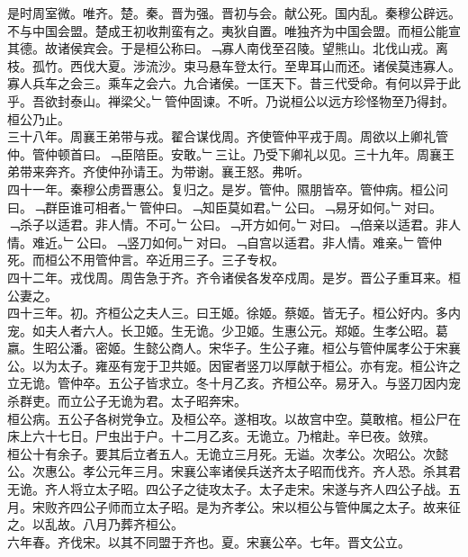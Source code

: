 \documentclass{zhvt-classic}
\begin{document}
\hspace*{2em}是时周室微。唯齐。楚。秦。晋为强。晋初与会。献公死。国内乱。秦穆公辟远。不与中国会盟。楚成王初收荆蛮有之。夷狄自置。唯独齐为中国会盟。而桓公能宣其德。故诸侯宾会。于是桓公称曰。﹁寡人南伐至召陵。望熊山。北伐山戎。离枝。孤竹。西伐大夏。涉流沙。束马悬车登太行。至卑耳山而还。诸侯莫违寡人。寡人兵车之会三。乘车之会六。九合诸侯。一匡天下。昔三代受命。有何以异于此乎。吾欲封泰山。禅梁父。﹂管仲固谏。不听。乃说桓公以远方珍怪物至乃得封。桓公乃止。\\
\hspace*{2em}三十八年。周襄王弟带与戎。翟合谋伐周。齐使管仲平戎于周。周欲以上卿礼管仲。管仲顿首曰。﹁臣陪臣。安敢。﹂三让。乃受下卿礼以见。三十九年。周襄王弟带来奔齐。齐使仲孙请王。为带谢。襄王怒。弗听。\\
\hspace*{2em}四十一年。秦穆公虏晋惠公。复归之。是岁。管仲。隰朋皆卒。管仲病。桓公问曰。﹁群臣谁可相者。﹂管仲曰。﹁知臣莫如君。﹂公曰。﹁易牙如何。﹂对曰。﹁杀子以适君。非人情。不可。﹂公曰。﹁开方如何。﹂对曰。﹁倍亲以适君。非人情。难近。﹂公曰。﹁竖刀如何。﹂对曰。﹁自宫以适君。非人情。难亲。﹂管仲死。而桓公不用管仲言。卒近用三子。三子专权。\\
\hspace*{2em}四十二年。戎伐周。周告急于齐。齐令诸侯各发卒戍周。是岁。晋公子重耳来。桓公妻之。\\
\hspace*{2em}四十三年。初。齐桓公之夫人三。曰王姬。徐姬。蔡姬。皆无子。桓公好内。多内宠。如夫人者六人。长卫姬。生无诡。少卫姬。生惠公元。郑姬。生孝公昭。葛嬴。生昭公潘。密姬。生懿公商人。宋华子。生公子雍。桓公与管仲属孝公于宋襄公。以为太子。雍巫有宠于卫共姬。因宦者竖刀以厚献于桓公。亦有宠。桓公许之立无诡。管仲卒。五公子皆求立。冬十月乙亥。齐桓公卒。易牙入。与竖刀因内宠杀群吏。而立公子无诡为君。太子昭奔宋。\\
\hspace*{2em}桓公病。五公子各树党争立。及桓公卒。遂相攻。以故宫中空。莫敢棺。桓公尸在床上六十七日。尸虫出于户。十二月乙亥。无诡立。乃棺赴。辛巳夜。敛殡。\\
\hspace*{2em}桓公十有余子。要其后立者五人。无诡立三月死。无谥。次孝公。次昭公。次懿公。次惠公。孝公元年三月。宋襄公率诸侯兵送齐太子昭而伐齐。齐人恐。杀其君无诡。齐人将立太子昭。四公子之徒攻太子。太子走宋。宋遂与齐人四公子战。五月。宋败齐四公子师而立太子昭。是为齐孝公。宋以桓公与管仲属之太子。故来征之。以乱故。八月乃葬齐桓公。\\
\hspace*{2em}六年春。齐伐宋。以其不同盟于齐也。夏。宋襄公卒。七年。晋文公立。\\
\end{document}
